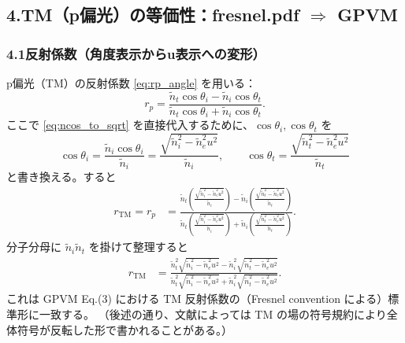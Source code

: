 \subsection*{4.\;TM（p偏光）の等価性：fresnel.pdf $\Rightarrow$ GPVM}
\subsubsection*{4.1\;反射係数（角度表示からu表示への変形）}
p偏光（TM）の反射係数 \eqref{eq:rp_angle} を用いる：
\[
r_p=\frac{\tilde n_t\cos\theta_i-\tilde n_i\cos\theta_t}{\tilde n_t\cos\theta_i+\tilde n_i\cos\theta_t}.
\]
ここで \eqref{eq:ncos_to_sqrt} を直接代入するために、$\cos\theta_i,\cos\theta_t$ を
\[
\cos\theta_i=\frac{\tilde n_i\cos\theta_i}{\tilde n_i}
=\frac{\sqrt{\tilde n_i^2-\tilde n_e^2u^2}}{\tilde n_i},
\qquad
\cos\theta_t=\frac{\sqrt{\tilde n_t^2-\tilde n_e^2u^2}}{\tilde n_t}
\]
と書き換える。すると
\begin{align}
r_{\mathrm{TM}}
=r_p
&=\frac{
\tilde n_t\left(\frac{\sqrt{\tilde n_i^2-\tilde n_e^2u^2}}{\tilde n_i}\right)
-\tilde n_i\left(\frac{\sqrt{\tilde n_t^2-\tilde n_e^2u^2}}{\tilde n_t}\right)
}{
\tilde n_t\left(\frac{\sqrt{\tilde n_i^2-\tilde n_e^2u^2}}{\tilde n_i}\right)
+\tilde n_i\left(\frac{\sqrt{\tilde n_t^2-\tilde n_e^2u^2}}{\tilde n_t}\right)
}.
\label{eq:rTM_intermediate}
\end{align}
分子分母に $\tilde n_i\tilde n_t$ を掛けて整理すると
\begin{align}
r_{\mathrm{TM}}
&=\frac{
\tilde n_t^2\sqrt{\tilde n_i^2-\tilde n_e^2u^2}
-\tilde n_i^2\sqrt{\tilde n_t^2-\tilde n_e^2u^2}
}{
\tilde n_t^2\sqrt{\tilde n_i^2-\tilde n_e^2u^2}
+\tilde n_i^2\sqrt{\tilde n_t^2-\tilde n_e^2u^2}
}.
\label{eq:rTM_u}
\end{align}
これは GPVM Eq.(3) における TM 反射係数の（Fresnel convention による）標準形に一致する。
（後述の通り、文献によっては TM の場の符号規約により全体符号が反転した形で書かれることがある。）

